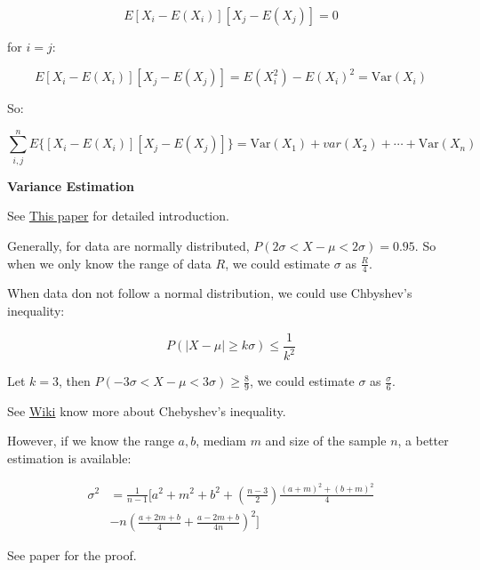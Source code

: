 \documentclass{article}
\newcommand{\Var}{\mathrm{Var}}
\begin{document}
\begin{equation}
E{[X_i-E(X_i)][X_j-E(X_j)]}=0
\end{equation}

for \(i=j\):

\begin{equation}
E{[X_i-E(X_i)][X_j-E(X_j)]}=E(X_i^2)-E(X_i)^2=\Var(X_i)
\end{equation}

So:

\begin{equation}
\sum_{i,j}^nE\{[X_i-E(X_i)][X_j-E(X_j)]\}=\Var(X_1)+var(X_2)+\cdots+\Var(X_n)
\end{equation}

\vspace{3mm}

\textbf{Variance Estimation}

See \href{https://bmcmedresmethodol.biomedcentral.com/articles/10.1186/1471-2288-5-13}{This paper} for
detailed introduction.

Generally, for data are normally distributed, \(P(2\sigma < X - \mu < 2\sigma) = 0.95\). So when we only know
the range of data \(R\), we could estimate \(\sigma\) as \(\frac{R}{4}\).

When data don not follow a normal distribution, we could use Chbyshev's inequality:

\begin{equation}
P(|X-\mu|\geq k\sigma) \leq \frac{1}{k^2}
\end{equation}

Let \(k=3\), then \(P(-3\sigma < X - \mu < 3\sigma)\geq \frac{8}{9}\), we could estimate \(\sigma\) as
\(\frac{\sigma}{6}\).

See \href{https://en.wikipedia.org/wiki/Chebyshev's_inequality}{Wiki} know more about Chebyshev's inequality.

However, if we know the range \(a, b\), mediam \(m\) and size of the sample \(n\), a better estimation is available:

\begin{equation}
\begin{split}
\sigma^2 &= \frac{1}{n-1}[a^2+m^2+b^2+(\frac{n-3}{2})\frac{(a+m)^2+(b+m)^2}{4}\\
&-n(\frac{a+2m+b}{4}+\frac{a-2m+b}{4n})^2]
\end{split}
\end{equation}

See paper for the proof.

\vspace{3mm}
\end{document}
